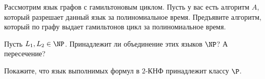 \begin{task}
   	Рассмотрим язык графов с гамильтоновым циклом. Пусть у вас есть алгоритм $A$, который разрешает данный язык за
    полиномиальное время. Предъявите алгоритм, который по графу выдает гамильтонов цикл за полиномиальное время.
\end{task}

\begin{task}
    Пусть $L_1, L_2 \in \NP$. Принадлежит ли объединение этих языков $\NP$? А пересечение?
\end{task}

\begin{task}
    Покажите, что язык выполнимых формул в $2$-КНФ принадлежит классу $\P$.
\end{task}